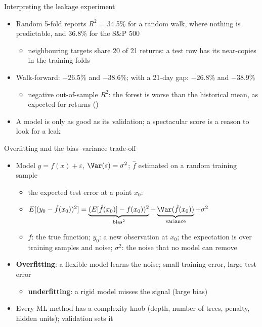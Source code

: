 \begin{frame}{Interpreting the leakage experiment}
\itemsize{\small}
\begin{itemize}
    \item Random 5-fold reports $R^2$ = 34.5\% for a random walk, where nothing is predictable, and 36.8\% for the S\&P 500
    \begin{itemize}
        \item neighbouring targets share 20 of 21 returns: a test row has its near-copies in the training folds
    \end{itemize}
    \item Walk-forward: $-$26.5\% and $-$38.6\%; with a 21-day gap: $-$26.8\% and $-$38.9\%
    \begin{itemize}
        \item negative out-of-sample $R^2$: the forest is worse than the historical mean, as expected for returns ()
    \end{itemize}
    \item A model is only as good as its validation; a spectacular score is a reason to look for a leak
\end{itemize}
\end{frame}

\begin{frame}{Overfitting and the bias--variance trade-off}
\itemsize{\small}
\begin{itemize}
    \item Model $y = f(x) + \varepsilon$, $\Var(\varepsilon) = \sigma^2$; $\hat f$ estimated on a random training sample
    \begin{itemize}
        \item the expected test error at a point $x_0$:
        \item $E[(y_0 - \hat f(x_0))^2] = \underbrace{(E[\hat f(x_0)] - f(x_0))^2}_{\text{bias}^2} + \underbrace{\Var(\hat f(x_0))}_{\text{variance}} + \sigma^2$
        \item $f$: the true function; $y_0$: a new observation at $x_0$; the expectation is over training samples and noise; $\sigma^2$: the noise that no model can remove
    \end{itemize}
    \item \textbf{Overfitting}: a flexible model learns the noise; small training error, large test error
    \begin{itemize}
        \item \textbf{underfitting}: a rigid model misses the signal (large bias)
    \end{itemize}
    \item Every ML method has a complexity knob (depth, number of trees, penalty, hidden units); validation sets it
\end{itemize}
\end{frame}

